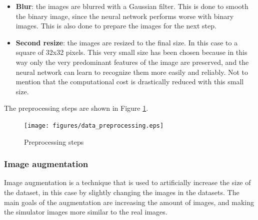 \documentclass[a4paper,12pt,sort&compress]{article}
\begin{document}
\begin{itemize}
        \item \textbf{Blur}: the images are blurred with a Gaussian filter. This is done to smooth
        the binary image, since the neural network performs worse with binary images. This is also
        done to prepare the images for the next step. 
        \item \textbf{Second resize}: the images are resized to the final size. In this case to a
        square of 32x32 pixels. This very small size has been chosen because in this way only the
        very predominant features of the image are preserved, and the neural network can learn to
        recognize them more easily and reliably. Not to mention that the computational cost is
        drastically reduced with this small size.
    \end{itemize}
    The preprocessing steps are shown in Figure \ref{fig:preprocessing_steps}.

    \begin{figure}
        \centering
        \texttt{[image: figures/data\_preprocessing.eps]}
        \caption{Preprocessing steps}
        \label{fig:preprocessing_steps}
    \end{figure} 

    \clearpage

    \subsubsection*{Image augmentation}
    Image augmentation is a technique that is used to artificially increase the size of the dataset,
    in this case by slightly changing the images in the datasets. The main goals of the augmentation
    are increasing the amount of images, and making the simulator images more similar to the
    real images. 
    
\end{document}

